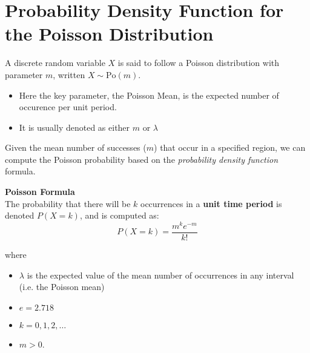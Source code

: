 \documentclass[a4paper,12pt]{article}
\begin{document}


\section*{Probability Density Function for the Poisson Distribution}
A discrete random variable $X$ is said to follow a Poisson distribution with parameter $m$, written $X \sim \mbox{Po}(m)$.



\begin{itemize}
	\item Here the key parameter, the Poisson Mean, is the expected number of occurence per unit period. 
	\item It is usually denoted as either $m$ or $\lambda$
\end{itemize}

\noindent Given the mean number of successes ($m$) that occur in a specified region, we can compute the Poisson probability based on the \textit{probability density function} formula.



\begin{framed}
	\noindent \textbf{Poisson Formula}\\
	The probability that there will be $k$ occurrences in a \textbf{unit time period} is denoted $P(X=k)$, and is computed as:
	{
		\large
		\[ P(X = k)=\frac{m^k e^{-m}}{k!} \]
	}
\end{framed}
\noindent where




\begin{itemize} 
	\item$\lambda$ is the expected value of the mean number of occurrences in any interval (i.e. the Poisson mean)
	\item $e=2.718$
	\item $k = 0, 1, 2, \ldots$
	\item $m > 0$.
\end{itemize}
\end{document}
